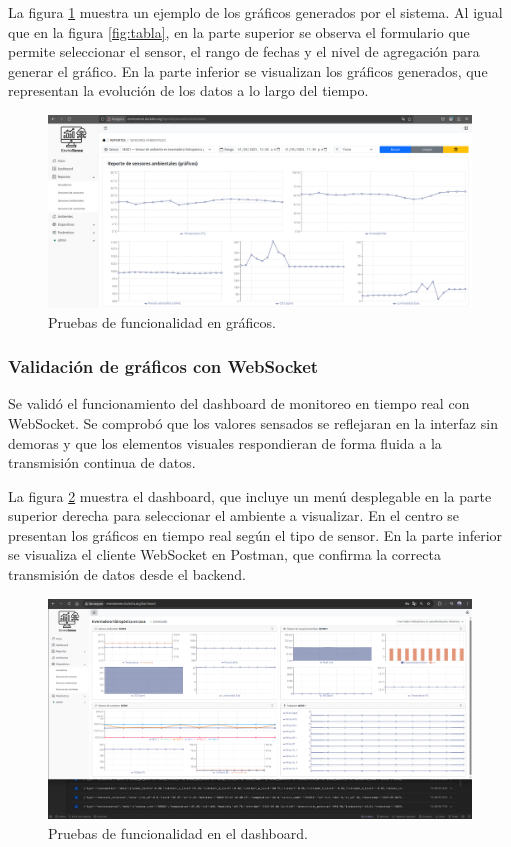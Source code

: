 La figura \ref{fig:grafico} muestra un ejemplo de los gráficos generados por el
sistema. Al igual que en la figura \ref{fig:tabla}, en la parte superior se
observa el formulario que permite seleccionar el sensor, el rango de fechas y
el nivel de agregación para generar el gráfico. En la parte inferior se
visualizan los gráficos generados, que representan la evolución de los datos a
lo largo del tiempo.

\begin{figure}[H]
    \centering
    \includegraphics[width=\textwidth]{Images/46_grafico.png}
    \caption[Pruebas de funcionalidad en gráficos]{Pruebas de funcionalidad en gráficos.}
    \label{fig:grafico}
\end{figure}

\subsubsection{Validación de gráficos con WebSocket}

Se validó el funcionamiento del dashboard de monitoreo en tiempo real con
WebSocket. Se comprobó que los valores sensados se reflejaran en la interfaz
sin demoras y que los elementos visuales respondieran de forma fluida a la
transmisión continua de datos.

La figura \ref{fig:dashboard} muestra el dashboard, que incluye un menú
desplegable en la parte superior derecha para seleccionar el ambiente a
visualizar. En el centro se presentan los gráficos en tiempo real según el tipo
de sensor. En la parte inferior se visualiza el cliente WebSocket en Postman,
que confirma la correcta transmisión de datos desde el backend.

\begin{figure}[H]
    \centering
    \includegraphics[width=\textwidth]{Images/47_dashboard.png}
    \caption[Pruebas de funcionalidad en el dashboard]{Pruebas de funcionalidad en el dashboard.}
    \label{fig:dashboard}
\end{figure}

